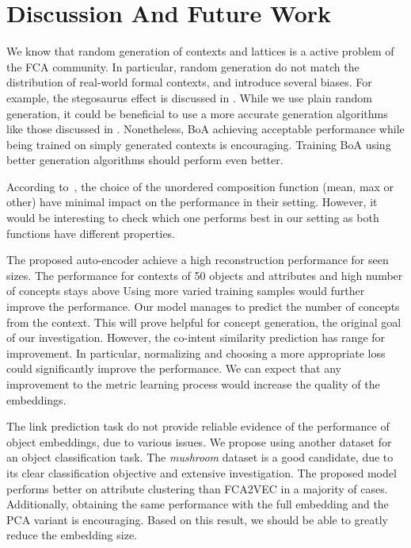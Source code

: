 \section{Discussion And Future Work}\label{seq:future-work}
We know that random generation of contexts and lattices is a active problem of the FCA community.
In particular, random generation do not match the distribution of real-world formal contexts, and introduce several biases.
For example, the stegosaurus effect is discussed in \cite{random-contexts:2016:borchmann}.
While we use plain random generation, it could be beneficial to use a more accurate generation algorithms like those discussed in \cite{random-closure:2011:ganter,random-context-dirichlet:2019:felde}.
Nonetheless, BoA achieving acceptable performance while being trained on simply generated contexts is encouraging.
Training BoA using better generation algorithms should perform even better.

According to~\cite{dan:2015:iyyer}, the choice of the unordered composition function (mean, max or other) have minimal impact on the performance in their setting. 
However, it would be interesting to check which one performs best in our setting as both functions have different properties.%

The proposed auto-encoder achieve a high reconstruction performance for seen sizes.
The performance for contexts of 50 objects and attributes and high number of concepts stays above
Using more varied training samples would further improve the performance.
%
Our model manages to predict the number of concepts from the context.
This will prove helpful for concept generation, the original goal of our investigation.
%
However, the co-intent similarity prediction has range for improvement.
In particular, normalizing and choosing a more appropriate loss could significantly improve the performance.
We can expect that any improvement to the metric learning process would increase the quality of the embeddings.

The link prediction task do not provide reliable evidence of the performance of object embeddings, due to various issues.
We propose using another dataset for an object classification task.
The \textit{mushroom} dataset is a good candidate, due to its clear classification objective and extensive investigation.
%
The proposed model performs better on attribute clustering than FCA2VEC in a majority of cases.
Additionally, obtaining the same performance with the full embedding and the PCA variant is encouraging.
Based on this result, we should be able to greatly reduce the embedding size.





